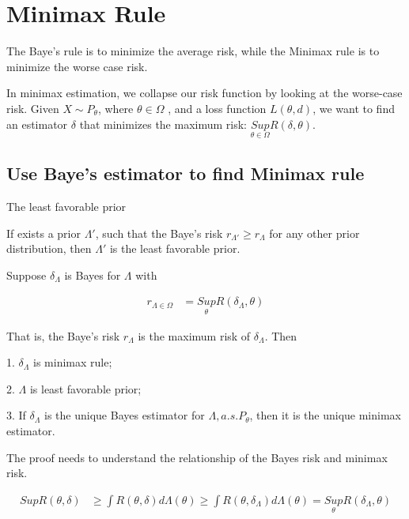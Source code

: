 \section{Minimax Rule}

The Baye's rule is to minimize the average risk, while the Minimax rule is to minimize the worse case risk. 

In minimax estimation, we collapse our risk function by looking at the worse-case risk. Given $X \sim P_{\theta}$, where $\theta \in \Omega$ , and a loss function $L(\theta, d)$, we want to find an estimator $\delta$ that
minimizes the maximum risk: $\underset{\theta \in \Omega}{Sup} R(\delta, \theta)$.


\subsection{Use Baye's estimator to find Minimax rule}

The least favorable prior 

\begin{Definition}
If exists a prior $\Lambda'$, such that the Baye's risk $r_{\Lambda'} \geq r_{\Lambda}$ for any other prior distribution, then $\Lambda'$ is the least favorable prior.
\end{Definition}

\begin{Theorem}
Suppose $\delta_{\Lambda}$ is Bayes for $\Lambda$ with 

\begin{align*}
r_{\Lambda \in \Omega} &= \underset{\theta}{Sup} R(\delta_{\Lambda}, \theta)
\end{align*}

That is, the Baye's risk $r_{\Lambda}$ is the maximum risk of $\delta_{\Lambda}$. Then

1. $\delta_{\Lambda}$ is minimax rule;

2. $\Lambda$ is least favorable prior;

3. If $\delta_{\Lambda}$ is the unique Bayes estimator for $\Lambda, a. s. P_{\theta}$, then it is the unique minimax estimator. 
\end{Theorem}


The proof needs to understand the relationship of the Bayes risk and minimax risk.

\begin{align*}
 Sup R(\theta, \delta) & \geq \int R(\theta, \delta) d \Lambda(\theta) \geq \int R(\theta, \delta_{\Lambda}) d \Lambda(\theta) = \underset{\theta}{Sup} R(\delta_{\Lambda}, \theta)
\end{align*}

